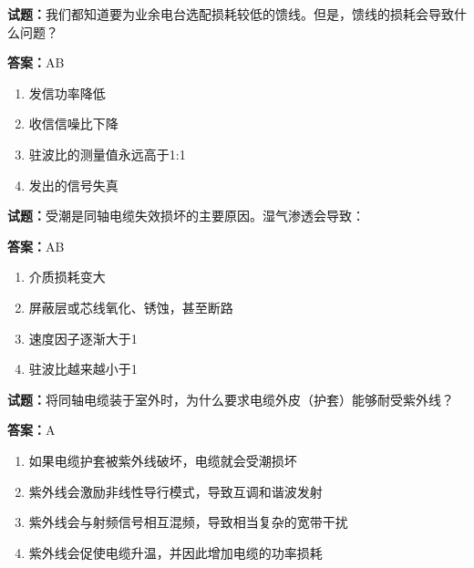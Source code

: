 \documentclass{ctexbook}
\begin{document}





\vspace{1em}

\textbf{试题：}我们都知道要为业余电台选配损耗较低的馈线。但是，馈线的损耗会导致什么问题？ 

\textbf{答案：}AB 

\begin{enumerate}[leftmargin=3em]
  \item 发信功率降低 

  \item 收信信噪比下降 

  \item 驻波比的测量值永远高于1:1 

  \item 发出的信号失真 

\end{enumerate}





\vspace{1em}

\textbf{试题：}受潮是同轴电缆失效损坏的主要原因。湿气渗透会导致： 

\textbf{答案：}AB 

\begin{enumerate}[leftmargin=3em]
  \item 介质损耗变大 

  \item 屏蔽层或芯线氧化、锈蚀，甚至断路 

  \item 速度因子逐渐大于1 

  \item 驻波比越来越小于1 

\end{enumerate}





\vspace{1em}

\textbf{试题：}将同轴电缆装于室外时，为什么要求电缆外皮（护套）能够耐受紫外线？ 

\textbf{答案：}A 

\begin{enumerate}[leftmargin=3em]
  \item 如果电缆护套被紫外线破坏，电缆就会受潮损坏 

  \item 紫外线会激励非线性导行模式，导致互调和谐波发射 

  \item 紫外线会与射频信号相互混频，导致相当复杂的宽带干扰 

  \item 紫外线会促使电缆升温，并因此增加电缆的功率损耗 

\end{enumerate}
\end{document}
